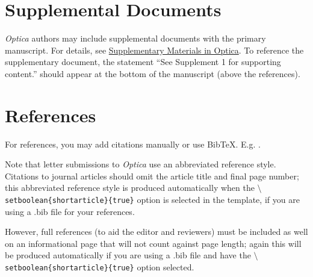 \documentclass[9pt,twocolumn,twoside]{optica}
\begin{document}
\section*{Supplemental Documents}
\emph{Optica} authors may include supplemental documents with the primary manuscript. For details, see \href{http://www.opticsinfobase.org/submit/style/supplementary-materials-optica.cfm}{Supplementary Materials in Optica}. To reference the supplementary document, the statement ``See Supplement 1 for supporting content.'' should appear at the bottom of the manuscript (above the references).


\section*{References}

For references, you may add citations manually or use BibTeX. E.g. \cite{Zhang:14}.

Note that letter submissions to \emph{Optica} use an abbreviated reference style. Citations to journal articles should omit the article title and final page number; this abbreviated reference style is produced automatically when the \texttt{$\setminus$setboolean\{shortarticle\}\{true\}} option is selected in the template, if you are using a .bib file for your references.

However, full references (to aid the editor and reviewers) must be included as well on an informational page that will not count against page length; again this will be produced automatically if you are using a .bib file and have the \texttt{$\setminus$setboolean\{shortarticle\}\{true\}} option selected.






\end{document}
